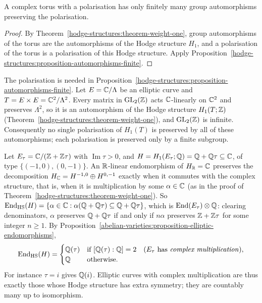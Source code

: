\begin{corollary}\label{hodge-structures:corollary-torus-automorphisms}
A complex torus with a polarisation has only finitely many group automorphisms preserving the polarisation.
\end{corollary}

\begin{proof}
By Theorem~\ref{hodge-structures:theorem-weight-one}, group automorphisms of the torus are the automorphisms of the Hodge structure $H_1$, and a polarisation of the torus is a polarisation of
this Hodge structure. Apply Proposition~\ref{hodge-structures:proposition-automorphisms-finite}.
\end{proof}

\begin{counterexample}\label{hodge-structures:counterexample-infinite-automorphisms}
The polarisation is needed in Proposition~\ref{hodge-structures:proposition-automorphisms-finite}. Let $E = \mathbb{C}/\Lambda$ be an elliptic curve and $T = E \times E = \mathbb{C}^2/\Lambda^2$. Every matrix in
$\mathrm{GL}_2(\mathbb{Z})$ acts $\mathbb{C}$-linearly on $\mathbb{C}^2$ and preserves $\Lambda^2$, so it is an automorphism of the Hodge structure $H_1(T; \mathbb{Z})$ (Theorem~\ref{hodge-structures:theorem-weight-one}), and
$\mathrm{GL}_2(\mathbb{Z})$ is infinite. Consequently no single polarisation of $H_1(T)$ is preserved by all of these automorphisms; each polarisation is preserved only by a finite subgroup.
\end{counterexample}

\begin{example}\label{hodge-structures:example-complex-multiplication}
Let $E_\tau = \mathbb{C}/(\mathbb{Z} + \mathbb{Z}\tau)$ with $\operatorname{Im}\tau > 0$, and $H = H_1(E_\tau; \mathbb{Q}) = \mathbb{Q} + \mathbb{Q}\tau \subseteq \mathbb{C}$, of type $\{(-1,0), (0,-1)\}$. An $\mathbb{R}$-linear endomorphism of $H_{\mathbb{R}} = \mathbb{C}$ preserves the
decomposition $H_{\mathbb{C}} = H^{-1,0} \oplus H^{0,-1}$ exactly when it commutes with the complex structure, that is, when it is multiplication by some $\alpha \in \mathbb{C}$ (as in the proof of
Theorem~\ref{hodge-structures:theorem-weight-one}). So $\operatorname{End}_{\mathrm{HS}}(H) = \{\alpha \in \mathbb{C} : \alpha(\mathbb{Q} + \mathbb{Q}\tau) \subseteq \mathbb{Q} + \mathbb{Q}\tau\}$, which is $\operatorname{End}(E_\tau) \otimes \mathbb{Q}$: clearing denominators,
$\alpha$ preserves $\mathbb{Q} + \mathbb{Q}\tau$ if and only if $n\alpha$ preserves $\mathbb{Z} + \mathbb{Z}\tau$ for some integer $n \geq 1$. By Proposition~\ref{abelian-varieties:proposition-elliptic-endomorphisms},
\[
\operatorname{End}_{\mathrm{HS}}(H) = \begin{cases}\mathbb{Q}(\tau) & \text{if } [\mathbb{Q}(\tau) : \mathbb{Q}] = 2 \quad (\text{$E_\tau$ has \emph{complex multiplication}}),\\ \mathbb{Q} & \text{otherwise.}\end{cases}
\]
For instance $\tau = i$ gives $\mathbb{Q}(i)$. Elliptic curves with complex multiplication are thus exactly those whose Hodge structure has extra symmetry; they are countably many up to isomorphism.
\end{example}

